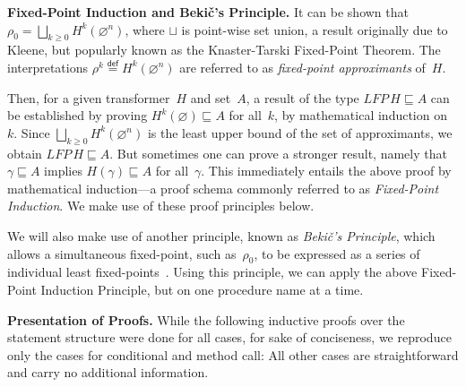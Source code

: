 \documentclass[10pt,a4paper]{amsart}
\theoremstyle{definition}
\newcommand{\defeq}{\stackrel{\mathsf{def}}{=}}
\begin{document}


\noindent\textbf{Fixed-Point Induction and Beki\v{c}'s Principle.}
% 
It can be shown that
$\rho_0 = \bigsqcup_{k \geq 0} H^k (\varnothing^n)$, where $\sqcup$ is
point-wise set union, a result originally due to Kleene, but popularly
known as the Knaster-Tarski Fixed-Point Theorem.
The interpretations $\rho^k \defeq H^k (\varnothing^n)$ are referred
to as \emph{fixed-point approximants} of~$H$.

Then, for a given transformer~$H$ and set~$A$, a result of the type
$\mathit{LFP}\, H \sqsubseteq A$ can be established by proving
$H^k (\varnothing) \sqsubseteq A$ for all~$k$, by mathematical
induction on~$k$. Since $\bigsqcup_{k \geq 0} H^k (\varnothing^n)$ is
the least upper bound of the set of approximants, we obtain
$\mathit{LFP}\, H \sqsubseteq A$.
%
But sometimes one can prove a stronger result, namely that
$\gamma \sqsubseteq A$ implies $H (\gamma) \sqsubseteq A$ for
all~$\gamma$. This immediately entails the above proof by mathematical
induction---a proof schema commonly referred to as \emph{Fixed-Point
  Induction}.
%
We make use of these proof principles below.

We will also make use of another principle, known as \emph{Beki\v{c}'s
  Principle}, which allows a simultaneous fixed-point, such
as~$\rho_0$, to be expressed as a series of individual least
fixed-points~\cite{bek-69}.
%
Using this principle, we can apply the above Fixed-Point Induction
Principle, but on one procedure name at a time.


\smallskip

\noindent\textbf{Presentation of Proofs.}
%
While the following inductive proofs over the statement structure were
done for all cases, for sake of conciseness, we reproduce only the
cases for conditional and method call: All other cases are
straightforward and carry no additional information.

\end{document}
